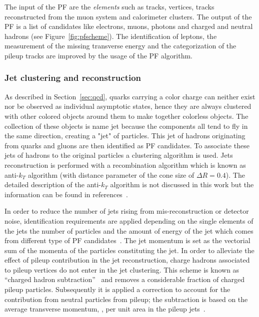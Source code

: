 The input of the PF are the \emph{elements} such as tracks, vertices, tracks
reconstructed from the muon system and
calorimeter clusters. The output of the PF is a list of candidates
like electrons, muons, photons and charged and neutral hadrons (see
Figure~\ref{fig:pfscheme}). The identification of leptons, the
measurement of the missing transverse energy and the categorization of the pileup tracks
are improved by the usage of the PF algorithm. 

\subsubsection{Jet clustering and
  reconstruction}\label{sec:jetclustering}
As described in Section~\ref{sec:qcd}, quarks carrying a color
charge can neither exist nor be observed as individual asymptotic
states, hence they are always clustered with other colored objects around them
to make together colorless objects. The collection of these objects is name 
jet because the components all tend to fly in the same direction,
creating a "jet" of particles. This jet of hadrons originating from
quarks and gluons are then identified as PF candidates. 
To associate these jets of hadrons to the original particles a clustering algorithm is used.
Jets reconstruction is performed with a recombination algorithm which
is known as anti-$k_T$ algorithm (with distance parameter of the cone size
of $\Delta R = 0.4$). The detailed description of the anti-$k_T$ algorithm is not
discussed in this work but the information can be found in 
references~\cite{Cacciari_2008,Cacciari_2012}.

In order to reduce the number of jets rising from mis-reconstruction or
detector noise, identification requirements are applied depending on the single elements of the
jets \ie the number of particles and the amount of energy of the
jet which comes from different type of PF candidates~\cite{CMS-PAS-JME-16-003}.
The jet momentum is set as the vectorial sum of the momenta of the
particles constituting the jet. In order to alleviate the effect of
pileup contribution in the jet reconstruction, charge hadrons
associated to pileup vertices do not enter in the jet clustering. This
scheme is known as ``charged hadron
subtraction''~\cite{CMS-PAS-JME-14-001} and removes a
considerable fraction of charged pileup particles.  
Subsequently it is applied a correction to account for the
contribution from neutral particles from pileup; the subtraction is
based on the average transverse momentum, \pt, per unit area in the
pileup jets~\cite{CACCIARI2008119, Cacciari_2008_area,
  Sirunyan:2020foa}.

